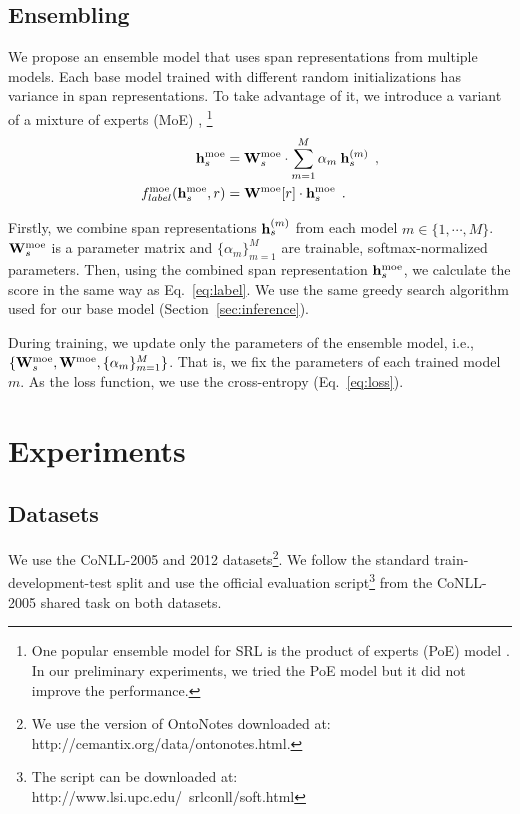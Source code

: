 \documentclass[11pt,a4paper]{article}
\begin{document}
\subsection{Ensembling}
\label{sec:mos}
We propose an ensemble model that uses span representations from multiple models.
Each base model trained with different random initializations has variance in span representations.
To take advantage of it, we introduce a variant of a mixture of experts (MoE) \cite{shazeer:17},
\footnote{One popular ensemble model for SRL is the product of experts (PoE) model \cite{fitzgerald:15,he:17,tan:18}.
In our preliminary experiments, we tried the PoE model but it did not improve the performance.}
\begin{align}
\label{eq:e1}
{\bf h}^{\text{moe}}_s & = {\bf W}^{\text{moe}}_s \cdot \sum^{M}_{m=1} \alpha_m \: {\bf h}^{(m)}_s \:\:,\\
\label{eq:e2}
f^\text{moe}_{label}({\bf h}^\text{moe}_s, r) & = {\bf W}^{\text{moe}}[r] \cdot {\bf h}^{\text{moe}}_s\:\:.
\end{align}

\noindent
Firstly, we combine span representations ${\bf h}^{(m)}_s$ from each model $m \in \{1, \cdots, M \}$.
${\bf W}^\text{moe}_s$ is a parameter matrix and $\{ \alpha_m \}^M_{m=1}$ are trainable, softmax-normalized parameters.
Then, using the combined span representation ${\bf h}^{\text{moe}}_s$, we calculate the score in the same way as Eq.~\ref{eq:label}.
We use the same greedy search algorithm used for our base model (Section~\ref{sec:inference}).

During training, we update only the parameters of the ensemble model, i.e., $\{ {\bf W}^{\text{moe}}_s, {\bf W}^{\text{moe}}, \{ \alpha_m \}^M_{m=1} \}$.
That is, we fix the parameters of each trained model $m$.
As the loss function, we use the cross-entropy (Eq.~\ref{eq:loss}).



\section{Experiments}
\label{sec:exp}

\subsection{Datasets}
We use the CoNLL-2005 and 2012 datasets\footnote{We use the version of OntoNotes downloaded at: http://cemantix.org/data/ontonotes.html.}.
We follow the standard train-development-test split and use the official evaluation script\footnote{The script can be downloaded at: http://www.lsi.upc.edu/~srlconll/soft.html} from the CoNLL-2005 shared task on both datasets.
\end{document}
